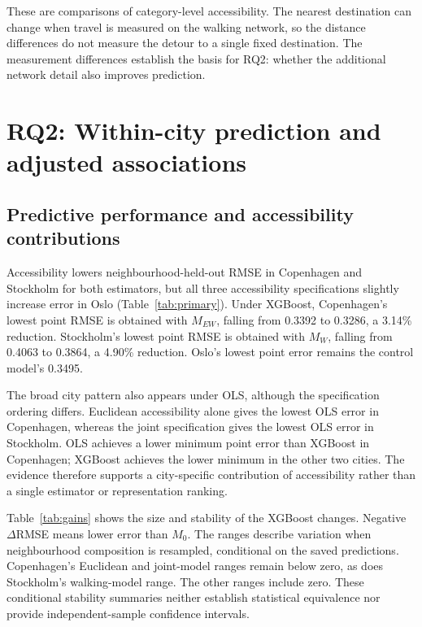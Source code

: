 \documentclass[11pt,a4paper,oneside,openany]{memoir}
\begin{document}
These are comparisons of category-level accessibility. The nearest destination
can change when travel is measured on the walking network, so the distance
differences do not measure the detour to a single fixed destination. The
measurement differences establish the basis for RQ2: whether the additional
network detail also improves prediction.

\section{RQ2: Within-city prediction and adjusted associations}
\label{sec:rq2-results}
\subsection{Predictive performance and accessibility contributions}
\label{sec:rq2-prediction}
Accessibility lowers neighbourhood-held-out RMSE in Copenhagen and Stockholm
for both estimators, but all three accessibility specifications slightly
increase error in Oslo (Table~\ref{tab:primary}). Under XGBoost, Copenhagen's
lowest point RMSE is obtained with $M_{EW}$, falling from 0.3392 to 0.3286, a
3.14\% reduction. Stockholm's lowest point RMSE is obtained with $M_W$, falling
from 0.4063 to 0.3864, a 4.90\% reduction. Oslo's lowest point error remains the
control model's 0.3495.



The broad city pattern also appears under OLS, although the specification
ordering differs. Euclidean accessibility alone gives the lowest OLS error in
Copenhagen, whereas the joint specification gives the lowest OLS error in
Stockholm. OLS achieves a lower minimum point error than XGBoost in Copenhagen;
XGBoost achieves the lower minimum in the other two cities. The evidence
therefore supports a city-specific contribution of accessibility rather than
a single estimator or representation ranking.

Table~\ref{tab:gains} shows the size and stability of the XGBoost changes.
Negative $\Delta$RMSE means lower error than $M_0$. The ranges describe
variation when neighbourhood composition is resampled, conditional on the
saved predictions. Copenhagen's Euclidean and joint-model ranges remain below
zero, as does Stockholm's walking-model range. The other ranges include zero.
These conditional stability summaries neither establish statistical equivalence
nor provide independent-sample confidence intervals.
\end{document}
